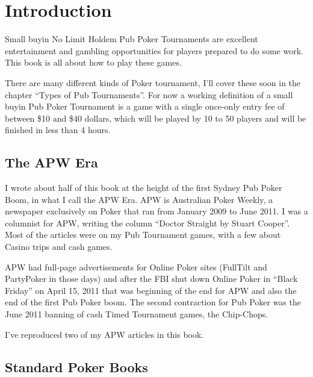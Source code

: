 \chapter{Introduction}


Small buyin No Limit Holdem Pub Poker Tournaments are excellent
entertainment and gambling opportunities for players prepared to do
some work. This book is all about how to play these games.

There are many different kinds of Poker tournament, I'll cover these
soon in the chapter ``Types of Pub Tournaments''. For now a
working definition of a small buyin
Pub Poker Tournament is a game with a single once-only entry fee of
between \$10 and \$40 dollars, which will be played by 10 to 50
players and will be finished in less than 4 hours.


\section{The APW Era}

I wrote about half of this book at the height of the first Sydney Pub
Poker Boom, in what I call the APW Era. APW is Australian Poker
Weekly, a newspaper exclusively on Poker that ran from January 2009 to
June 2011. I was a columnist for APW, writing the column
``Doctor Straight by Stuart Cooper''. Most of the articles were on my
Pub Tournament games, with a few about Casino trips and cash games.

APW had full-page advertisements for Online Poker sites (FullTilt
and PartyPoker in those days) and after the FBI shut down Online Poker
in ``Black Friday'' on April 15, 2011 that was beginning of the end
for APW and also the end of the first Pub Poker boom. The second
contraction for Pub Poker was the June 2011 banning of cash Timed
Tournament games, the Chip-Chops.

I've reproduced two of my APW articles in this book.
\section{Standard Poker Books}

